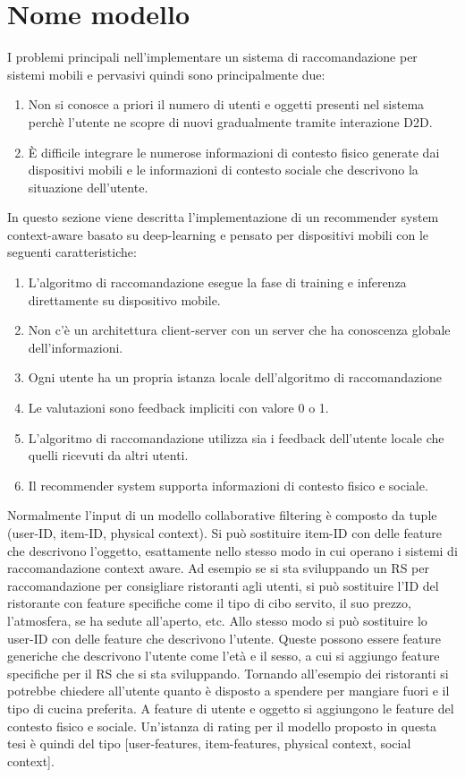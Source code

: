 \documentclass[12pt,italian]{report}
\begin{document}
\section{Nome modello}
I problemi principali nell'implementare un sistema di raccomandazione per sistemi mobili e pervasivi quindi sono principalmente due:
\begin{enumerate}
 \item Non si conosce a priori il numero di utenti e oggetti presenti nel sistema perchè l'utente ne scopre di nuovi gradualmente tramite interazione D2D.
 \item \`E difficile integrare le numerose informazioni di contesto fisico generate dai dispositivi mobili e le informazioni di contesto sociale che descrivono la situazione dell'utente.
\end{enumerate}
In questo sezione viene descritta l'implementazione di un recommender system context-aware basato su deep-learning e pensato per dispositivi mobili con le seguenti caratteristiche:
\begin{enumerate}
 \item L'algoritmo di raccomandazione esegue la fase di training e inferenza direttamente su dispositivo mobile.
 \item Non c'è un architettura client-server con un server che ha conoscenza globale dell'informazioni.
 \item Ogni utente ha un propria istanza locale dell'algoritmo di raccomandazione
 \item Le valutazioni sono feedback impliciti con valore 0 o 1.
 \item L'algoritmo di raccomandazione utilizza sia i feedback dell'utente locale che quelli ricevuti da altri utenti.
 \item Il recommender system supporta informazioni di contesto fisico e sociale.
\end{enumerate}
Normalmente l'input di un modello collaborative filtering è composto da tuple (user-ID, item-ID, physical context). Si può sostituire item-ID con delle feature che descrivono l'oggetto, esattamente nello stesso modo in cui operano i sistemi di raccomandazione context aware. Ad esempio se si sta sviluppando un RS per raccomandazione per consigliare ristoranti agli utenti, si può sostituire l'ID del ristorante con feature specifiche come il tipo di cibo servito, il suo prezzo, l'atmosfera, se ha sedute all'aperto, etc. Allo stesso modo si può sostituire lo user-ID con delle feature che descrivono l'utente. Queste possono essere feature generiche che descrivono l'utente come l'età e il sesso, a cui si aggiungo feature specifiche per il RS che si sta sviluppando. Tornando all'esempio dei ristoranti si potrebbe chiedere all'utente quanto è disposto a spendere per mangiare fuori e il tipo di cucina preferita. A feature di utente e oggetto si aggiungono le feature del contesto fisico e sociale. Un'istanza di rating per il modello proposto in questa tesi è quindi del tipo [user-features, item-features, physical context, social context].
\end{document}

